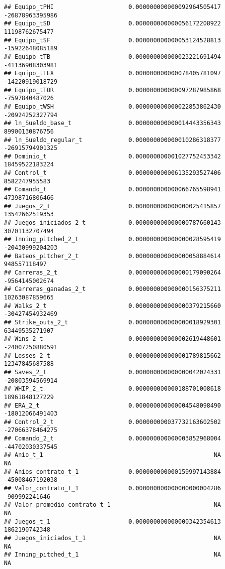 \documentclass[
]{article}
\begin{document}
\begin{verbatim}
## Equipo_tPHI                     0.000000000000092964505417 -26878963395986
## Equipo_tSD                      0.000000000000056172208922  11198762675477
## Equipo_tSF                      0.000000000000053124528813 -15922648085189
## Equipo_tTB                      0.000000000000023221691494 -41136908303981
## Equipo_tTEX                     0.000000000000078405781097 -14220919018729
## Equipo_tTOR                     0.000000000000097287985868  -7597840487026
## Equipo_tWSH                     0.000000000000022853862430 -20924252327794
## ln_Sueldo_base_t                0.000000000000014443356343  89900130876756
## ln_Sueldo_regular_t             0.000000000000010286318377 -26915794901325
## Dominio_t                       0.000000000001027752453342  18459522183224
## Control_t                       0.000000000006135293527406   8582247955583
## Comando_t                       0.000000000000066765598941  47398716806466
## Juegos_2_t                      0.000000000000000025415857  13542662519353
## Juegos_iniciados_2_t            0.000000000000000787660143  30701132707494
## Inning_pitched_2_t              0.000000000000000028595419 -20430999204203
## Bateos_pitcher_2_t              0.000000000000000058884614    948557118497
## Carreras_2_t                    0.000000000000000179090264  -9564145002674
## Carreras_ganadas_2_t            0.000000000000000156375211  10263087859665
## Walks_2_t                       0.000000000000000379215660 -30427454932469
## Strike_outs_2_t                 0.000000000000000018929301  63449535271907
## Wins_2_t                        0.000000000000002619448601 -24007250880591
## Losses_2_t                      0.000000000000001789815662  12347845687588
## Saves_2_t                       0.000000000000000042024331 -20803594569914
## WHIP_2_t                        0.000000000000188701008618  18961848127229
## ERA_2_t                         0.000000000000004548098490 -18012066491403
## Control_2_t                     0.000000000037732163602502 -27066378464275
## Comando_2_t                     0.000000000000003852968004 -44702030337545
## Anio_t_1                                                NA              NA
## Anios_contrato_t_1              0.000000000000159997143884 -45008467192038
## Valor_contrato_t_1              0.000000000000000000004286   -909992241646
## Valor_promedio_contrato_t_1                             NA              NA
## Juegos_t_1                      0.000000000000000342354613   1862190742348
## Juegos_iniciados_t_1                                    NA              NA
## Inning_pitched_t_1                                      NA              NA

\end{verbatim}
\end{document}
